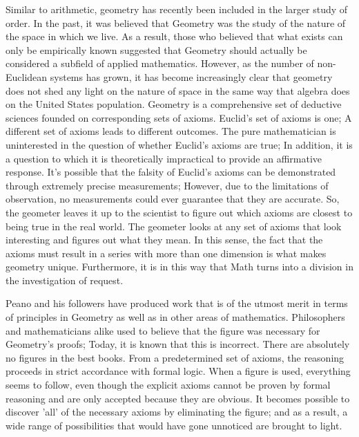 \documentclass[a4paper,12pt]{book}[2004/02/16]
\theoremstyle{ilemma}
\theoremstyle{itheorem}
\theoremstyle{iother}
\theoremstyle{icorollary}
\theoremstyle{numcorollary}
\theoremstyle{idefinition}
\begin{document}
Similar to arithmetic, geometry has recently been included in the larger study of order. In the past, it was believed that Geometry was the study of the nature of the space in which we live. As a result, those who believed that what exists can only be empirically known suggested that Geometry should actually be considered a subfield of applied mathematics. However, as the number of non-Euclidean systems has grown, it has become increasingly clear that geometry does not shed any light on the nature of space in the same way that algebra does on the United States population. Geometry is a comprehensive set of deductive sciences founded on corresponding sets of axioms. Euclid's set of axioms is one; A different set of axioms leads to different outcomes. The pure mathematician is uninterested in the question of whether Euclid's axioms are true; In addition, it is a question to which it is theoretically impractical to provide an affirmative response. It's possible that the falsity of Euclid's axioms can be demonstrated through extremely precise measurements; However, due to the limitations of observation, no measurements could ever guarantee that they are accurate. So, the geometer leaves it up to the scientist to figure out which axioms are closest to being true in the real world. The geometer looks at any set of axioms that look interesting and figures out what they mean. In this sense, the fact that the axioms must result in a series with more than one dimension is what makes geometry unique.
Furthermore, it is in this way that Math turns into a division in the investigation of
request.

Peano and his followers have produced work that is of the utmost merit in terms of principles in Geometry as well as in other areas of mathematics.
Philosophers and mathematicians alike used to believe that the figure was necessary for Geometry's proofs; Today, it is known that this is incorrect. There are absolutely no figures in the best books. From a predetermined set of axioms, the reasoning proceeds in strict accordance with formal logic. When a figure is used, everything seems to follow, even though the explicit axioms cannot be proven by formal reasoning and are only accepted because they are obvious. It becomes possible to discover 'all' of the necessary axioms by eliminating the figure; and as a result, a wide range of possibilities that would have gone unnoticed are brought to light.
\end{document}

